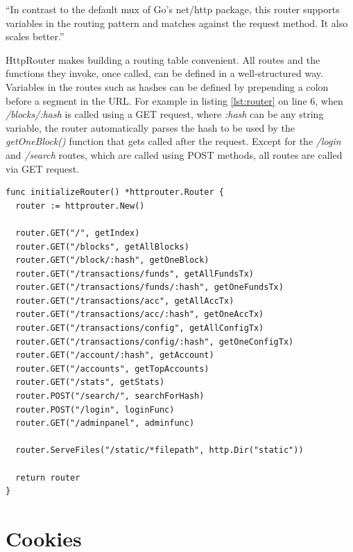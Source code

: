 ``In contrast to the default mux of Go's net/http package, this router supports variables in the routing pattern and matches against the request method. It also scales better.'' \cite{httprouter}

HttpRouter makes building a routing table convenient. All routes and the functions they invoke, once called, can be defined in a well-structured way. Variables in the routes such as hashes can be defined by prepending a colon before a segment in the URL. For example in listing \ref{lst:router} on line 6, when \emph{/blocks/:hash} is called using a GET request, where \emph{:hash} can be any string variable, the router automatically parses the hash to be used by the \emph{getOneBlock()} function that gets called after the request. Except for the \emph{/login} and \emph{/search} routes, which are called using POST methods, all routes are called via GET request.
\\
\begin{lstlisting}[caption={Initialization of the Router},captionpos=b,label={lst:router}]
func initializeRouter() *httprouter.Router {
  router := httprouter.New()

  router.GET("/", getIndex)
  router.GET("/blocks", getAllBlocks)
  router.GET("/block/:hash", getOneBlock)
  router.GET("/transactions/funds", getAllFundsTx)
  router.GET("/transactions/funds/:hash", getOneFundsTx)
  router.GET("/transactions/acc", getAllAccTx)
  router.GET("/transactions/acc/:hash", getOneAccTx)
  router.GET("/transactions/config", getAllConfigTx)
  router.GET("/transactions/config/:hash", getOneConfigTx)
  router.GET("/account/:hash", getAccount)
  router.GET("/accounts", getTopAccounts)
  router.GET("/stats", getStats)
  router.POST("/search/", searchForHash)
  router.POST("/login", loginFunc)
  router.GET("/adminpanel", adminfunc)

  router.ServeFiles("/static/*filepath", http.Dir("static"))

  return router
}
\end{lstlisting}

\section{Cookies} \label{cookies}

